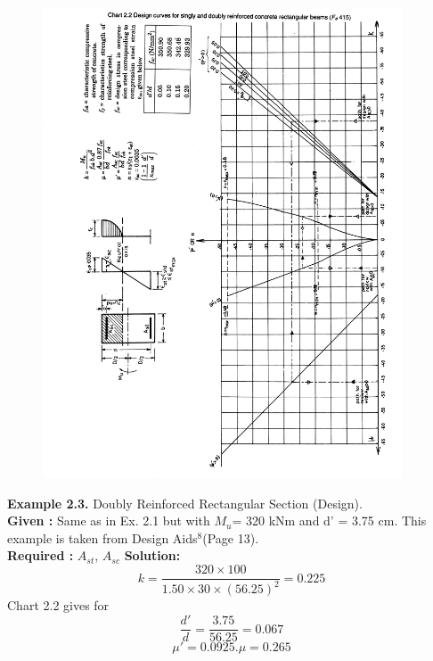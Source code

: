 \begin{figure}
\centering
\includegraphics[width=0.95\textwidth]{images/ch2-6.png}
\caption{}
\label{fig:Values for parameters}
\end{figure}
\newpage
\textbf{Example 2.3.} Doubly Reinforced Rectangular Section (Design).\\
\textbf{Given :}  Same as in Ex. 2.1 but with ${M_{u}}$= 320 kNm and d’ = 3.75 cm. This example is taken
from Design Aids$^{8}$(Page 13).\\
\textbf{Required :} ${A_{st}}$, ${A_{sc}}$
\textbf{Solution:} 
\begin{equation*}
k=\frac{320 \times 100}{1.50 \times 30 \times (56.25)^2}=0.225
\end{equation*}
Chart 2.2 gives for
\begin{equation*}
\frac{d'}{d}=\frac{3.75}{56.25}=0.067 
\end{equation*}
\begin{equation*}
\mu'=0.0925.\mu=0.265
\end{equation*}
